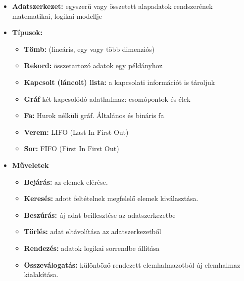 \documentclass[12pt,a4paper]{article}
\begin{document}
            \begin{tcolorbox}[colback=blue!5!white,colframe=blue!50!black,title= 17. Ismertesse az alapvető adatszerkezet típusokat és ezek műveleteit!]
                \begin{itemize}
                    \item \textbf{Adatszerkezet:} egyszerű vagy összetett alapadatok rendszerének matematikai, logikai modellje
                    \item \textbf{Típusok:}
                    \begin{itemize}
                        \item \textbf{Tömb:} (lineáris, egy vagy több dimenziós)
                        \item \textbf{Rekord:} összetartozó adatok egy példányhoz
                        \item \textbf{Kapcsolt (láncolt) lista:} a kapcsolati információt is tároljuk
                        \item \textbf{Gráf} két kapcsolódó adathalmaz: csomópontok és élek
                        \item \textbf{Fa:} Hurok nélküli gráf. Általános és bináris fa
                        \item \textbf{Verem:} LIFO (Last In First Out)
                        \item \textbf{Sor:} FIFO (First In First Out)
                    \end{itemize}
                    \item \textbf{Műveletek}
                    \begin{itemize}
                        \item \textbf{Bejárás:} az elemek elérése.
                        \item \textbf{Keresés:} adott feltételnek megfelelő elemek kiválasztása.
                        \item \textbf{Beszúrás:} új adat beillesztése az adatszerkezetbe
                        \item \textbf{Törlés:} adat eltávolítása az adatszerkezetből
                        \item \textbf{Rendezés:} adatok logikai sorrendbe állítása
                        \item \textbf{Összeválogatás:} különböző rendezett elemhalmazotból új elemhalmaz kialakítása.
                    \end{itemize}
                \end{itemize}
            \end{tcolorbox}
            
\end{document}
